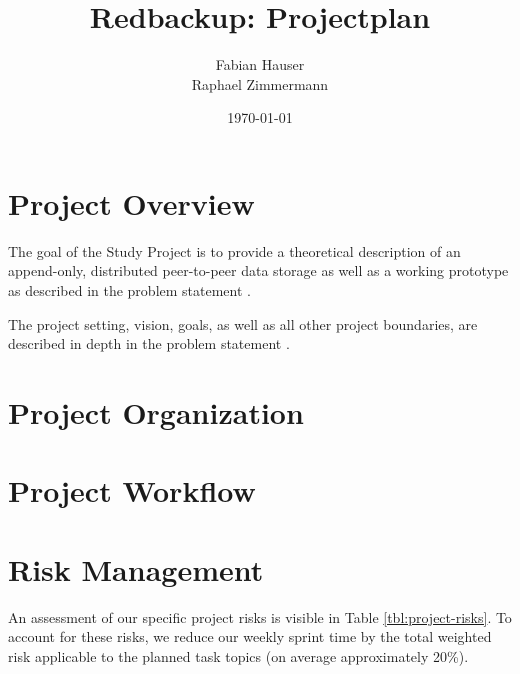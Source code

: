 \documentclass[a4paper]{article}
\title{Redbackup: Projectplan}
\author{
		Fabian Hauser \\
		Raphael Zimmermann
}
\date{\today}
\begin{document}
\maketitle

\section{Project Overview}
The goal of the Study Project is to provide a theoretical description of an append-only, distributed peer-to-peer data storage as well as a working prototype as described in the problem statement \cite{problemstatement}.

The project setting, vision, goals, as well as all other project boundaries, are described in depth in the problem statement \cite{problemstatement}.

\section{Project Organization}


\section{Project Workflow}


\section{Risk Management}

An assessment of our specific project risks is visible in Table \ref{tbl:project-risks}. To account for these risks, we reduce our weekly sprint time by the total weighted risk applicable to the planned task topics (on average approximately 20\%).
\end{document}

